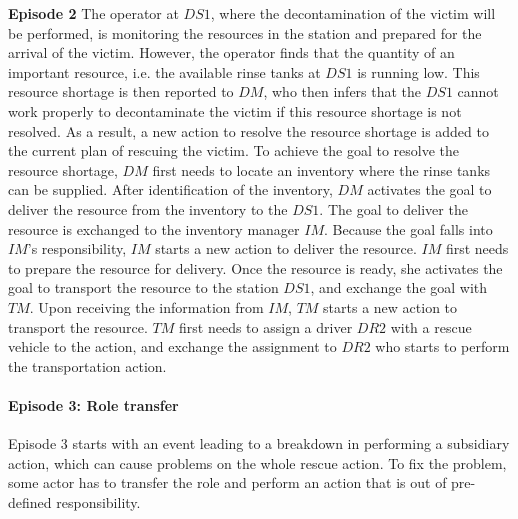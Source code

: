 \begin{scenario}
\footnotesize
\textbf{Episode 2} The operator at $DS1$, where the decontamination of the victim will be performed, is monitoring the resources in the station and prepared for the arrival of the victim. However, the operator finds that the quantity of an important resource, i.e. the available rinse tanks at $DS1$ is running low. This resource shortage is then reported to $DM$, who then infers that the $DS1$ cannot work properly to decontaminate the victim if this resource shortage is not resolved. As a result, a new action to resolve the resource shortage is added to the current plan of rescuing the victim. To achieve the goal to resolve the resource shortage, $DM$ first needs to locate an inventory where the rinse tanks can be supplied. After identification of the inventory, $DM$ activates the goal to deliver the resource from the inventory to the $DS1$. The goal to deliver the resource is exchanged to the inventory manager $IM$. Because the goal falls into $IM$'s responsibility, $IM$ starts a new action to deliver the resource. $IM$ first needs to prepare the resource for delivery. Once the resource is ready, she activates the goal to transport the resource to the station $DS1$, and exchange the goal with $TM$. Upon receiving the information from $IM$, $TM$ starts a new action to transport the resource. $TM$ first needs to assign a driver $DR2$ with a rescue vehicle to the action, and exchange the assignment to $DR2$ who starts to perform the transportation action.
\end{scenario}

\paragraph*{Episode 3: Role transfer} %
\label{par:episode_3_role_transfer}
Episode 3 starts with an event leading to a breakdown in performing a subsidiary action, which can cause problems on the whole rescue action. To fix the problem, some actor has to transfer the role and perform an action that is out of pre-defined responsibility.

